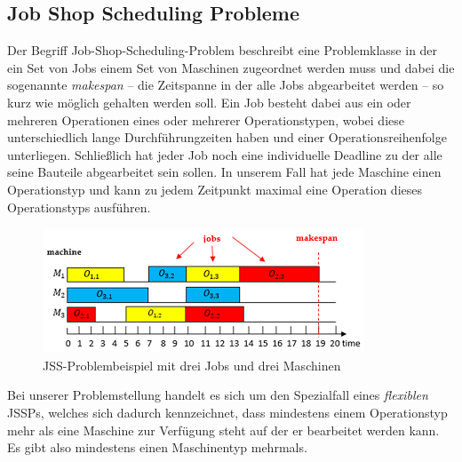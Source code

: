 \subsection{Job Shop Scheduling Probleme}
\label{subsec:jssp}
Der Begriff Job-Shop-Scheduling-Problem beschreibt eine Problemklasse in der ein Set von Jobs einem Set von Maschinen zugeordnet werden muss und dabei die sogenannte \textit{makespan} -- die Zeitspanne in der alle Jobs abgearbeitet werden -- so kurz wie möglich gehalten werden soll.
Ein Job besteht dabei aus ein oder mehreren Operationen eines oder mehrerer Operationstypen, wobei diese unterschiedlich lange Durchführungzeiten haben und einer Operationsreihenfolge unterliegen.
Schließlich hat jeder Job noch eine individuelle Deadline zu der alle seine Bauteile abgearbeitet sein sollen. In unserem Fall hat jede Maschine einen Operationstyp und kann zu jedem Zeitpunkt maximal eine Operation dieses Operationstyps ausführen\cite{Venturelli2016}.
\begin{figure}[H]
	\centering
	\includegraphics[scale=0.5]{images/JSSP.png}
	\caption{JSS-Problembeispiel mit drei Jobs und drei Maschinen}
	\label{figure:JSSP-Beispiel}
\end{figure}
Bei unserer Problemstellung handelt es sich um den Spezialfall eines \textit{flexiblen} JSSPs, welches sich dadurch kennzeichnet, dass mindestens einem Operationstyp mehr als eine Maschine zur Verfügung steht auf der er bearbeitet werden kann. Es gibt also mindestens einen Maschinentyp mehrmals. \cite{Nezhad2017}\\


